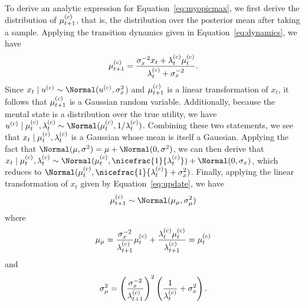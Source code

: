 To derive an analytic expression for Equation~\ref{eq:myopicmax}, we first derive the distribution of $\mu_{t+1}^{(c)}$, that is, the distribution over the posterior mean after taking a sample. Applying the transition dynamics given in Equation~\ref{eq:dynamics}, we have
%
\begin{equation}
  \label{eq:update}
  \mu_{t+1}^{(c)}=\frac
  {\sigma_{x}^{-2}x_t+\lambda_{t}^{(c)}\mu_{t}^{(c)}}
  {\lambda_{t}^{(c)}+\sigma_{x}^{-2}}.
\end{equation}
%
Since $x_t \mid u^{(c)} \sim \Normal(u^{(c)},\sigma_{x}^{2}$) and $\mu_{t+1}^{(c)}$ is a linear transformation of $x_t$, it follows that $\mu_{t+1}^{(c)}$ is a Gaussian random variable. Additionally, because the mental state is a distribution over the true utility, we have $u^{(c)} \mid \currentmean, \currentlam \sim \Normal(\currentmean,1/\currentlam)$. Combining these two statements, we see that $x_t \mid \mu_{t}^{(c)}, \lambda_{t}^{(c)}$ is a Gaussian whose mean is itself a Gaussian. Applying the fact that $\Normal(\mu, \sigma^2) = \mu + \Normal(0,  \sigma^2)$, we can then derive that $\conditionalx \sim \Normal(\currentmean, \nicefrac{1}{\currentlam}) + \Normal(0, \sigma_x)$, which reduces to $\Normal(\currentmean, \nicefrac{1}{\currentlam}+\sigma_{x}^{2})$.
Finally, applying the linear transformation of $x_t$ given by Equation~\ref{eq:update}, we have
%
\begin{equation*}
  \postmean \sim
    \Normal(\mu_\mu, \sigma^2_\mu)
\end{equation*}
where
\begin{equation*}
  \mu_\mu =  \frac{\sigma_{x}^{-2}}{\lambda_{t+1}^{(c)}}\mu_{t}^{(c)}+\frac{\lambda_{t}^{(c)}\mu_{t}^{(c)}}{\lambda_{t+1}^{(c)}}=\mu_{t}^{(c)}
\end{equation*}
and
\begin{equation*}
  \sigma^2_\mu = {\left(\frac{\sigma_{x}^{-2}}{\lambda_{t+1}^{(c)}}\right)}^{2}\left(\frac{1}{\lambda_{t}^{(c)}}+\sigma_{x}^{2}\right).
\end{equation*}
%

